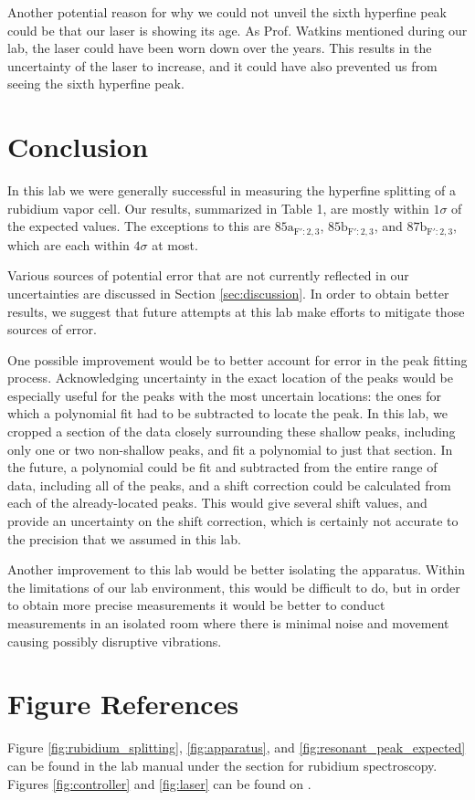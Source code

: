 \documentclass[twocolumn,amsmath,amssymb,pra, floatfix]{revtex4-2}
\begin{document}
Another potential reason for why we could not unveil the sixth hyperfine peak could be that our laser is showing its age. As Prof. Watkins mentioned during our lab, the laser could have been worn down over the years. This results in the uncertainty of the laser to increase, and it could have also prevented us from seeing the sixth hyperfine peak. 

\section{Conclusion}

In this lab we were generally successful in measuring the hyperfine splitting of a rubidium vapor cell. Our results, summarized in Table 1, are mostly within $1 \sigma$ of the expected values. The exceptions to this are $85\mathrm{a}_{\mathrm{F}': 2, 3}$, $85\mathrm{b}_{\mathrm{F}': 2, 3}$, and $87\mathrm{b}_{\mathrm{F}': 2, 3}$, which are each within $4 \sigma$ at most. 

Various sources of potential error that are not currently reflected in our uncertainties are discussed in Section \ref{sec:discussion}. In order to obtain better results, we suggest that future attempts at this lab make efforts to mitigate those sources of error.

One possible improvement would be to better account for error in the peak fitting process. Acknowledging uncertainty in the exact location of the peaks would be especially useful for the peaks with the most uncertain locations: the ones for which a polynomial fit had to be subtracted to locate the peak. In this lab, we cropped a section of the data closely surrounding these shallow peaks, including only one or two non-shallow peaks, and fit a polynomial to just that section. In the future, a polynomial could be fit and subtracted from the entire range of data, including all of the peaks, and a shift correction could be calculated from each of the already-located peaks. This would give several shift values, and provide an uncertainty on the shift correction, which is certainly not accurate to the precision that we assumed in this lab. 

Another improvement to this lab would be better isolating the apparatus. Within the limitations of our lab environment, this would be difficult to do, but in order to obtain more precise measurements it would be better to conduct measurements in an isolated room where there is minimal noise and movement causing possibly disruptive vibrations. 


\section{Figure References}
Figure \ref{fig:rubidium_splitting}, \ref{fig:apparatus}, and \ref{fig:resonant_peak_expected} can be found in the lab manual under the section for rubidium spectroscopy. Figures \ref{fig:controller} and \ref{fig:laser} can be found on \cite{teachspin}.



\end{document}
